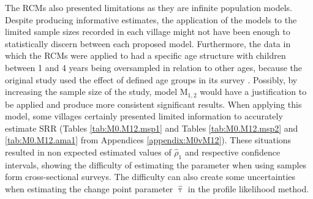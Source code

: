 The RCMs also presented limitations as they are infinite population models.
Despite producing informative estimates, the application of the models to the limited sample sizes recorded in each village might not have been enough to statistically discern between each proposed model.
Furthermore, the data in which the RCMs were applied to had a specific age structure with children between 1 and 4 years being oversampled in relation to other ages, because the original study used the effect of defined age groups in its survey \cite{drakeley2005estimating}.
Possibly, by increasing the sample size of the study, model M$_{1,2}$ would have a justification to be applied and produce more consistent significant results.
When applying this model, some villages certainly presented limited information to accurately estimate SRR (Tables \ref{tab:M0.M12.msp1} and Tables \ref{tab:M0.M12.msp2} and \ref{tab:M0.M12.ama1} from Appendices \ref{appendix:M0vM12}).
These situations resulted in non expected estimated values of $ \widehat{\rho}_1$ and respective confidence intervals, showing the difficulty of estimating the parameter when using samples form cross-sectional surveys.
The difficulty can also create some uncertainties when estimating the change point parameter $ \widehat{\uptau}$ in the profile likelihood method.

